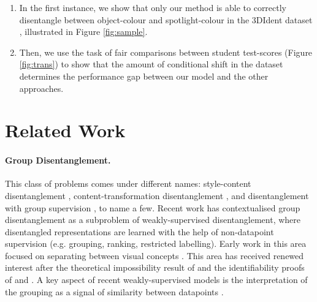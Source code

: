 \documentclass{article} %
\newcommand{\change}[1]{#1}
\newcommand{\todo}[1]{\textcolor{red}{#1}}
\begin{document}
\begin{enumerate}
\item \change{In the first instance, we show that only our method is able to correctly disentangle between object-colour and spotlight-colour in the 3DIdent dataset \citep{Zimmerman2021Contrastive},  illustrated in Figure \ref{fig:sample}. }
\item \change{Then, we use the task of fair comparisons between student test-scores (Figure \ref{fig:trans}) to show that the amount of conditional shift in the dataset determines the performance gap between our model and the other approaches.}
\end{enumerate}

\section{Related Work}


\paragraph{Group Disentanglement.} This class of problems comes under different names: style-content disentanglement \citep{Tenenbaum2000SeparatingSA}, content-transformation disentanglement \citep{Hosoya2019GroupbasedLO},  and disentanglement with group supervision \citep{Shu2020Weakly}, to name a few. Recent work \citep{Shu2020Weakly, Locatello2020WeaklySupervisedDW} has contextualised group disentanglement as a subproblem of weakly-supervised disentanglement, where disentangled representations are learned with the help of non-datapoint supervision (e.g. grouping, ranking, restricted labelling). Early work in this area focused on separating between visual concepts \citep{Kulkarni2015DeepCI, Reed2015DeepVA}. This area has received renewed interest after the theoretical impossibility result of \citet{Locatello2019ChallengingCA} and the identifiability proofs of \citet{Khemakhem2020VariationalAA} and \citet{Mita2021AnID}. A key aspect of recent weakly-supervised models is the interpretation of the grouping as a signal of similarity between datapoints \citep{Chen2020WeaklySD}. 

\end{document}
